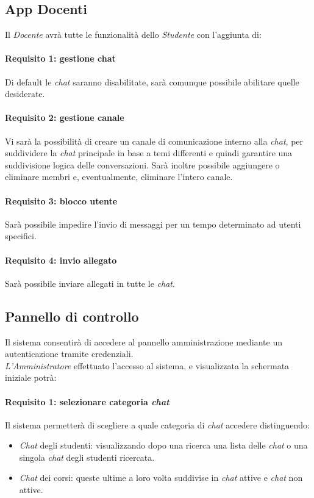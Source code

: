 \begin{enumerate}
\subsection{App Docenti}
Il \emph{Docente} avrà tutte le funzionalità dello \emph{Studente} con l’aggiunta di:

\paragraph{Requisito 1: gestione chat\\}
Di default le \emph{chat} saranno disabilitate, sarà comunque possibile abilitare quelle desiderate.

\paragraph{Requisito 2: gestione canale\\}
Vi sarà la possibilità di creare un canale di comunicazione interno alla \emph{chat}, per suddividere la \emph{chat} principale in base a temi differenti e quindi garantire una suddivisione logica delle conversazioni. Sarà inoltre possibile aggiungere o eliminare membri e, eventualmente, eliminare l’intero canale.

\paragraph{Requisito 3: blocco utente\\}
Sarà possibile impedire l’invio di messaggi per un tempo determinato ad utenti specifici.

\paragraph{Requisito 4: invio allegato\\}
Sarà possibile inviare allegati in tutte le \emph{chat}.


\subsection{Pannello di controllo}
Il sistema consentirà di accedere al pannello amministrazione mediante un autenticazione tramite credenziali.\\
\emph{L’Amministratore} effettuato l’accesso al sistema, e visualizzata la schermata iniziale potrà:

\paragraph{Requisito 1: selezionare categoria \emph{chat}\\}
Il sistema permetterà di scegliere a quale categoria di \emph{chat} accedere distinguendo: 
\begin{itemize}
\item \emph{Chat} degli studenti: visualizzando dopo una ricerca una lista delle \emph{chat} o una singola \emph{chat} degli studenti ricercata.
\item \emph{Chat} dei corsi: queste ultime a loro volta suddivise in \emph{chat} attive e \emph{chat} non attive.
\end{itemize}


\end{enumerate}
